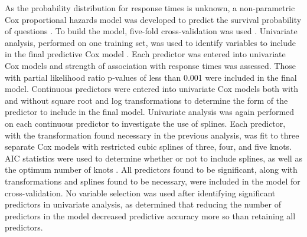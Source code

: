 \documentclass{article}
\begin{document}
As the probability distribution for response times is unknown, a non-parametric Cox proportional hazards model was developed to predict the survival probability of questions \cite{Moore2010}. To build the model, five-fold cross-validation was used \cite{Rodriguez2010}. Univariate analysis, performed on one training set, was used to identify variables to include in the final predictive Cox model \cite{Hammermeister1979}. Each predictor was entered into univariate Cox models and strength of association with response times was assessed. Those with partial likelihood ratio p-values of less than 0.001 were included in the final model.  Continuous predictors were entered into univariate Cox models both with and without square root and log transformations to determine the form of the predictor to include in the final model. Univariate analysis was again performed on each continuous predictor to investigate the use of splines. Each predictor, with the transformation found necessary in the previous analysis, was fit to three separate Cox models with restricted cubic splines of three, four, and five knots. AIC statistics were used to determine whether or not to include splines, as well as the optimum number of knots \cite{Harrell2015}. All predictors found to be significant, along with transformations and splines found to be necessary, were included in the model for cross-validation. No variable selection was used after identifying significant predictors in univariate analysis, as \cite{Harrell2015} determined that reducing the number of predictors in the model decreased predictive accuracy more so than retaining all predictors. 
\end{document}

